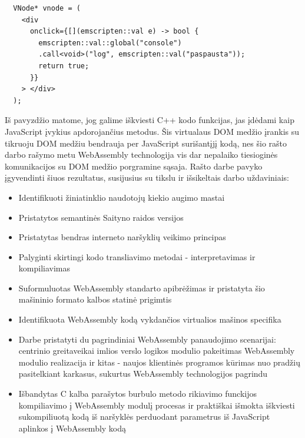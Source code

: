 \documentclass{VUMIFPSkursinis}
\begin{document}
\begin{center}
\begin{small}
\begin{verbatim}
  VNode* vnode = (
    <div
      onclick={[](emscripten::val e) -> bool {
        emscripten::val::global("console")
        .call<void>("log", emscripten::val("paspausta"));
        return true;
      }}
    > </div>
  );
\end{verbatim}
\end{small}
\end{center}
Iš pavyzdžio matome, jog galime iškviesti C++ kodo funkcijas, jas įdėdami kaip JavaScript įvykius apdorojančius metodus. Šis virtualaus DOM medžio įrankis su tikruoju DOM medžiu bendrauja per JavaScript surišantįjį kodą, nes šio rašto darbo rašymo metu WebAssembly technologija vis dar nepalaiko tiesioginės komunikacijos su DOM medžio porgramine sąsaja.
Rašto darbe pavyko įgyvendinti šiuos rezultatus, susijusius su tikslu ir išsikeltais darbo uždaviniais:
\begin{itemize}
  \item Identifikuoti žiniatinklio naudotojų kiekio augimo mastai
  \item Pristatytos semantinės Saityno raidos versijos
  \item Pristatytas bendras interneto naršyklių veikimo principas
  \item Palyginti skirtingi kodo transliavimo metodai - interpretavimas ir kompiliavimas
\item Suformuluotas WebAssembly standarto apibrėžimas ir pristatyta šio mašininio formato kalbos statinė prigimtis
  \item Identifikuota WebAssembly kodą vykdančios virtualios mašinos specifika
  \item Darbe pristatyti du pagrindiniai WebAssembly panaudojimo scenarijai: centrinio greitaveikai imlios verslo logikos modulio pakeitimas WebAssembly modulio realizacija ir kitas - naujos klientinės programos kūrimas nuo pradžių pasitelkiant karkasus, sukurtus WebAssembly technologijos pagrindu
  \item  Išbandytas C kalba parašytos burbulo metodo rikiavimo funckijos kompiliavimo į WebAssembly modulį procesas ir praktiškai išmokta iškviesti sukompiliuotą kodą iš naršyklės perduodant parametrus iš JavaScript aplinkos  į WebAssembly kodą
\end{itemize}
\end{document}
